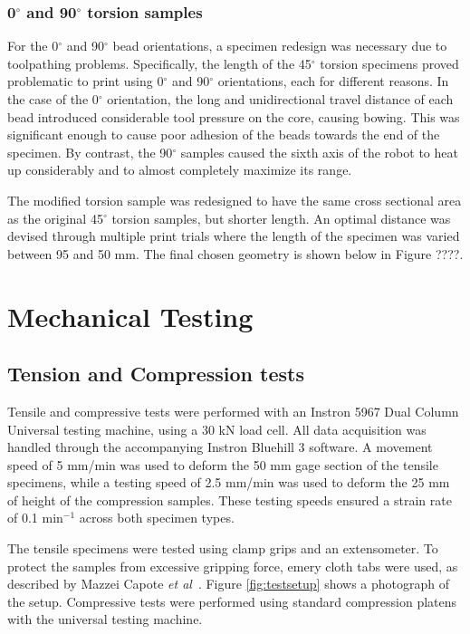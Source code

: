 \documentclass[main.tex]{subfiles}
\begin{document}
\subsubsection{0$^\circ$ and 90$^\circ$ torsion samples}
For the 0$^\circ$ and 90$^\circ$ bead orientations, a specimen redesign was necessary due to toolpathing problems. Specifically, the length of the 45$^\circ$ torsion specimens proved problematic to print using 0$^\circ$ and 90$^\circ$ orientations, each for different reasons. In the case of the 0$^\circ$ orientation, the long and unidirectional travel distance of each bead introduced considerable tool pressure on the core, causing bowing. This was significant enough to cause poor adhesion of the beads towards the end of the specimen. By contrast, the 90$^\circ$ samples caused the sixth axis of the robot to heat up considerably and to almost completely maximize its range. 

The modified torsion sample was redesigned to have the same cross sectional area as the original 45$^\circ$ torsion samples, but shorter length. An optimal distance was devised through multiple print trials where the length of the specimen was varied between 95 and 50 mm. The final chosen geometry is shown below in Figure ????.%

\section{Mechanical Testing}

\subsection{Tension and Compression tests}
Tensile and compressive tests were performed with an Instron 5967 Dual Column Universal testing machine, using a 30 kN load cell. All data acquisition was handled through the accompanying Instron Bluehill 3 software. A movement speed of 5 mm/min was used to deform the 50 mm gage section of the tensile specimens, while a testing speed of 2.5 mm/min was used to deform the 25 mm of height of the compression samples. These testing speeds ensured a strain rate of 0.1 min$^{-1}$ across both specimen types.

The tensile specimens were tested using clamp grips and an extensometer. To protect the samples from excessive gripping force, emery cloth tabs were used, as described by Mazzei Capote \emph{et al}~\cite{Capote2017}. Figure \ref{fig:testsetup} shows a photograph of the setup. Compressive tests were performed using standard compression platens with the universal testing machine. 
    
\end{document}

